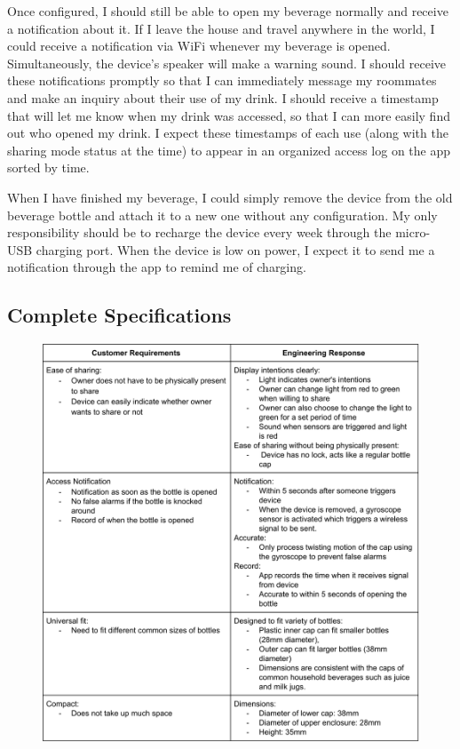 \documentclass[12pt]{article}
\begin{document}
		Once configured, I should still be able to open my beverage normally and receive a notification about it. If I leave the house and travel anywhere in the world, I could receive a notification via WiFi whenever my beverage is opened. Simultaneously, the device’s speaker will make a warning sound. I should receive these notifications promptly so that I can immediately message my roommates and make an inquiry about their use of my drink. I should receive a timestamp that will let me know when my drink was accessed, so that I can more easily find out who opened my drink. I expect these timestamps of each use (along with the sharing mode status at the time) to appear in an organized access log on the app sorted by time. 
		
		When I have finished my beverage, I could simply remove the device from the old beverage bottle and attach it to a new one without any configuration. My only responsibility should be to recharge the device every week through the micro-USB charging port. When the device is low on power, I expect it to send me a notification through the app to remind me of charging.
		
		\subsection*{Complete Specifications}

		
		\begin{figure}[H]
		\centering
		\includegraphics[width=\textwidth]{specs.png}
		\end{figure}
		\setlength{\parindent}{0pt}
\end{document}
